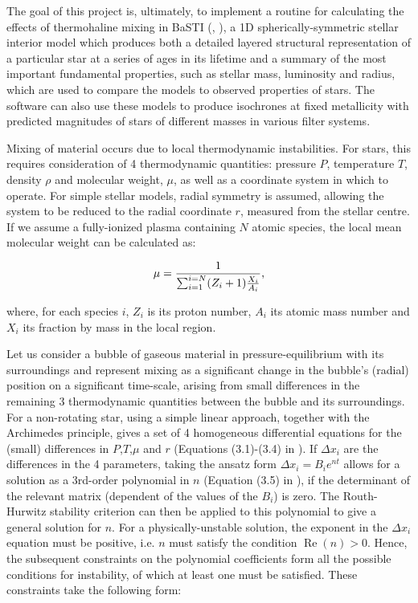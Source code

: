 \documentclass[12pt, a4paper]{report}
\begin{document}
The goal of this project is, ultimately, to implement a routine for calculating  the effects of thermohaline mixing in BaSTI (\cite{2004ApJ...612..168P}, \cite{2008ASPC..394..285P}), a 1D spherically-symmetric stellar interior model which produces both a detailed layered structural representation of a particular star at a series of ages in its lifetime and a summary of the most important fundamental properties, such as stellar mass, luminosity and radius, which are used to compare the models to observed properties of stars. The software can also use these models to produce isochrones at fixed metallicity \citep{2013A&A...558A..46P} with predicted magnitudes of stars of different masses in various filter systems.

Mixing of material occurs due to local thermodynamic instabilities. For stars, this requires consideration of 4 thermodynamic quantities: pressure $P$, temperature $T$, density $\rho$ and molecular weight, $\mu$, as well as a coordinate system in which to operate. For simple stellar models, radial symmetry is assumed, allowing the system to be reduced to the radial coordinate $r$, measured from the stellar centre. If we assume a fully-ionized plasma containing $N$ atomic species, the local mean molecular weight can be calculated as:

\begin{equation}
\mu = \frac{1}{\sum_{i=1}^{i=N} (Z_{i}+1) \frac{X_{i}}{A_{i}}} \textnormal{,}
\label{mol_weight_def}
\end{equation}

where, for each species $i$, $Z_{i}$ is its proton number, $A_{i}$ its atomic mass number and $X_{i}$ its fraction by mass in the local region.

Let us consider a bubble of gaseous material in pressure-equilibrium with its surroundings and represent mixing as a significant change in the bubble's (radial) position on a significant time-scale, arising from small differences in the remaining 3 thermodynamic quantities between the bubble and its surroundings. For a non-rotating star, using a simple linear approach, together with the Archimedes principle, gives a set of 4 homogeneous differential equations for the (small) differences in $P$,$T$,$\mu$ and $r$ (Equations (3.1)-(3.4) in \cite{2017RSOS....470192S}). If $\Delta x_{i}$ are the differences in the 4 parameters, taking the ansatz form $\Delta x_{i} = B_{i} e^{nt}$ allows for a solution as a 3rd-order polynomial in $n$ (Equation (3.5) in \cite{2017RSOS....470192S}), if the determinant of the relevant matrix (dependent of the values of the $B_{i}$) is zero. The Routh-Hurwitz stability criterion can then be applied to this polynomial to give a general solution for $n$. For a physically-unstable solution, the exponent in the $\Delta x_{i}$ equation must be positive, i.e. $n$ must satisfy the condition $\operatorname{Re}(n) > 0$. Hence, the subsequent constraints on the polynomial coefficients form all the possible conditions for instability,  of which at least one must be satisfied. These constraints take the following form:
\end{document}
